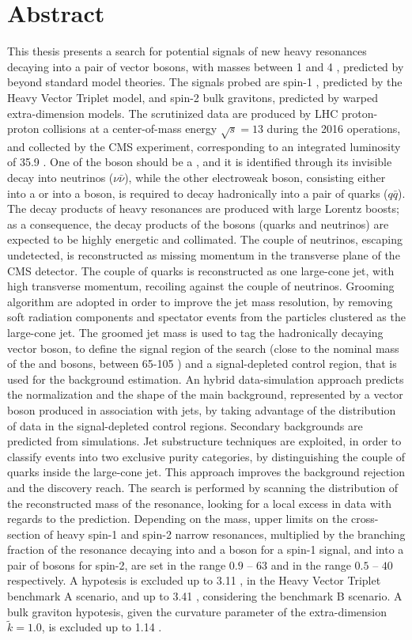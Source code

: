 \chapter*{Abstract}
\label{ch:abstract}

This thesis presents a search for potential signals of new heavy resonances decaying into a pair of vector bosons, with masses between 1 \TeV and 4 \TeV, predicted by beyond standard model theories. The signals probed are spin-1 \Wp, predicted by the Heavy Vector Triplet model, and spin-2 bulk gravitons, predicted by warped extra-dimension models. The scrutinized data are produced by LHC proton-proton collisions at a center-of-mass energy $\sqrt{s}=13$ \TeV during the 2016 operations, and collected by the CMS experiment, corresponding to an integrated luminosity of 35.9 \fbinv. One of the boson should be a \Z, and it is identified through its invisible decay into neutrinos ($\nu \bar{\nu}$), while the other electroweak boson, consisting either into a \W or into a \Z boson, is required to decay hadronically into a pair of quarks ($q \bar{q}$). The decay products of heavy resonances are produced with large Lorentz boosts; as a consequence, the decay products of the bosons (quarks and neutrinos) are expected to be highly energetic and collimated. The couple of neutrinos, escaping undetected, is reconstructed as missing momentum in the transverse plane of the CMS detector. The couple of quarks is reconstructed as one large-cone jet, with high transverse momentum, recoiling against the couple of neutrinos. Grooming algorithm are adopted in order to improve the jet mass resolution, by removing soft radiation components and spectator events from the particles clustered as the large-cone jet. The groomed jet mass is used to tag the hadronically decaying vector boson, to define the signal region of the search (close to the nominal mass of the \W and \Z bosons, between 65-105 \GeV) and a signal-depleted control region, that is used for the background estimation. An hybrid data-simulation approach predicts the normalization and the shape of the main background, represented by a vector boson produced in association with jets, by taking advantage of the distribution of data in the signal-depleted control regions. Secondary backgrounds are predicted from simulations. Jet substructure techniques are exploited, in order to classify events into two exclusive purity categories, by distinguishing the couple of quarks inside the large-cone jet. This approach improves the background rejection and the discovery reach. The search is performed by scanning the distribution of the reconstructed mass of the resonance, looking for a local excess in data with regards to the prediction. Depending on the mass, upper limits on the cross-section of heavy spin-1 and spin-2 narrow resonances, multiplied by the branching fraction of the resonance decaying into \Z and a \W boson for a spin-1 signal, and into a pair of \Z bosons for spin-2, are set in the range $0.9$ -- $63$ \fb and in the range $0.5$ -- $40$ \fb respectively. A \Wp hypotesis is excluded up to 3.11 \TeV, in the Heavy Vector Triplet benchmark A scenario, and up to 3.41 \TeV, considering the benchmark B scenario. A bulk graviton hypotesis, given the curvature parameter of the extra-dimension $\tilde{k}=1.0$, is excluded up to 1.14 \TeV.


\clearpage
